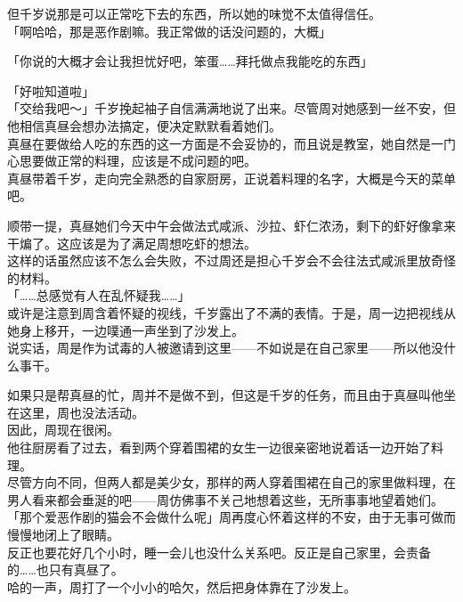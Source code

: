 但千岁说那是可以正常吃下去的东西，所以她的味觉不太值得信任。\\

「啊哈哈，那是恶作剧嘛。我正常做的话没问题的，大概」

「你说的大概才会让我担忧好吧，笨蛋……拜托做点我能吃的东西」

「好啦知道啦」\\

「交给我吧～」千岁挽起袖子自信满满地说了出来。尽管周对她感到一丝不安，但他相信真昼会想办法搞定，便决定默默看着她们。\\

真昼在要做给人吃的东西的这一方面是不会妥协的，而且说是教室，她自然是一门心思要做正常的料理，应该是不成问题的吧。\\

真昼带着千岁，走向完全熟悉的自家厨房，正说着料理的名字，大概是今天的菜单吧。

顺带一提，真昼她们今天中午会做法式咸派、沙拉、虾仁浓汤，剩下的虾好像拿来干煸了。这应该是为了满足周想吃虾的想法。\\

这样的话虽然应该不怎么会失败，不过周还是担心千岁会不会往法式咸派里放奇怪的材料。\\

「……总感觉有人在乱怀疑我……」\\

或许是注意到周含着怀疑的视线，千岁露出了不满的表情。于是，周一边把视线从她身上移开，一边噗通一声坐到了沙发上。\\

说实话，周是作为试毒的人被邀请到这里——不如说是在自己家里——所以他没什么事干。

如果只是帮真昼的忙，周并不是做不到，但这是千岁的任务，而且由于真昼叫他坐在这里，周也没法活动。\\

因此，周现在很闲。\\

他往厨房看了过去，看到两个穿着围裙的女生一边很亲密地说着话一边开始了料理。\\

尽管方向不同，但两人都是美少女，那样的两人穿着围裙在自己的家里做料理，在男人看来都会垂涎的吧——周仿佛事不关己地想着这些，无所事事地望着她们。\\

「那个爱恶作剧的猫会不会做什么呢」周再度心怀着这样的不安，由于无事可做而慢慢地闭上了眼睛。\\

反正也要花好几个小时，睡一会儿也没什么关系吧。反正是自己家里，会责备的……也只有真昼了。\\

哈的一声，周打了一个小小的哈欠，然后把身体靠在了沙发上。
